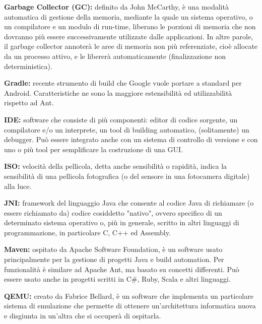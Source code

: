 \textbf{Garbage Collector (GC):} definito da John McCarthy, è una modalità automatica di gestione della memoria, mediante la quale un sistema operativo, o un compilatore e un modulo di run-time, liberano le porzioni di memoria che non dovranno più essere successivamente utilizzate dalle applicazioni. In altre parole, il garbage collector annoterà le aree di memoria non più referenziate, cioè allocate da un processo attivo, e le libererà automaticamente (finalizzazione non deterministica).

\textbf{Gradle:} recente strumento di build che Google vuole portare a standard per Android. Caratteristiche ne sono la maggiore estensibilità ed utilizzabilità rispetto ad Ant.

\textbf{IDE:} software che consiste di più componenti: editor di codice sorgente, un compilatore e/o un interprete, un tool di building automatico, (solitamente) un debugger. Può essere integrato anche con un sistema di controllo di versione e con uno o più tool per semplificare la costruzione di una GUI.

\textbf{ISO:} velocità della pellicola, detta anche sensibilità o rapidità, indica la sensibilità di una pellicola fotografica (o del sensore in una fotocamera digitale) alla luce.

\textbf{JNI:} framework del linguaggio Java che consente al codice Java di richiamare (o essere richiamato da) codice cosiddetto "nativo", ovvero specifico di un determinato sistema operativo o, più in generale, scritto in altri linguaggi di programmazione, in particolare C, C++ ed Assembly.

\textbf{Maven:} ospitato da Apache Software Foundation, è un software usato principalmente per la gestione di progetti Java e build automation. Per funzionalità è similare ad Apache Ant, ma basato su concetti differenti. Può essere usato anche in progetti scritti in C\#, Ruby, Scala e altri linguaggi.

\textbf{QEMU:} creato da Fabrice Bellard, è un software che implementa un particolare sistema di emulazione che permette di ottenere un'architettura informatica nuova e disgiunta in un'altra che si occuperà di ospitarla. 

